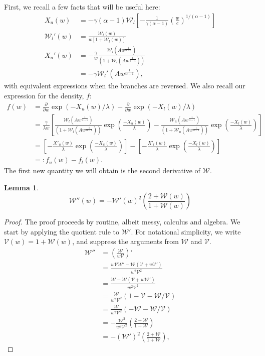 \documentclass{article}
\newcommand{\sW}{\mathscr{W}}
\newcommand{\sV}{\mathscr{V}}
\newtheorem{lemma}{Lemma}
\begin{document}
First, we recall a few facts that will be useful here:
%
\begin{align}
    X_u(w) &= -\gamma (\alpha - 1) \sW_l\left[ - \frac{1}{\gamma (\alpha - 1)} \left( \frac{w}{c} \right)^{1 / (\alpha - 1)} \right]\\
    \sW_l'(w) &= \frac{\sW_l(w)}{w [1 + \sW_l(w)]} \label{eq:W_prime}\\
    X_u'(w) &= - \frac{\gamma}{w} \frac{\sW_l(A w^{ \frac{1}{\alpha-1} })}{ \left( 1 + \sW_l(A w^{ \frac{1}{\alpha-1} }) \right)}\\
    &= - \gamma \sW_l'(A w^{ \frac{1}{\alpha-1} }),
\end{align}
%
with equivalent expressions when the branches are reversed. We also recall our expression for the density, $f$:
%
\begin{align}
    f(w) &= \frac{\partial}{\partial w} \exp(-X_u(w)/ \lambda) - \frac{\partial}{\partial w} \exp(-X_l(w)/\lambda) \\
    &= \frac{\gamma}{\lambda w} \left[ \frac{\sW_l(A w^{ \frac{1}{\alpha-1} })}{ \left( 1 + \sW_l(A w^{ \frac{1}{\alpha-1} }) \right)} \exp\left(\frac{-X_{u}(w)}{\lambda}\right) - \frac{\sW_u(A w^{ \frac{1}{\alpha-1} })}{ \left( 1 + \sW_u(A w^{ \frac{1}{\alpha-1} }) \right)}  \exp\left(\frac{-X_{l}(w)}{\lambda}\right) \right]\\
    &= \left[ - \frac{X'_u(w)}{\lambda} \exp\left(\frac{-X_{u}(w)}{\lambda}\right) \right] - \left[- \frac{X'_l(w)}{\lambda} \exp\left(\frac{-X_{l}(w)}{\lambda}\right) \right] \label{eq:wt_dens}\\
    &=: f_u(w) - f_l(w). \label{eq:f_u_f_l}
\end{align}
%
The first new quantity we will obtain is the second derivative of $\sW$.

\begin{lemma}
    \begin{equation}
        \sW''(w) = - \sW'(w)^2 \left(\frac{2 + \sW(w)}{1 + \sW(w)}\right) \label{eq:W_prime_prime}
    \end{equation}
\end{lemma}
\begin{proof}
    The proof proceeds by routine, albeit messy, calculus and algebra. We start by applying the quotient rule to $\sW'$. For notational simplicity, we write $\sV(w) = 1 + \sW(w)$, and suppress the arguments from $\sW$ and $\sV$.
    \begin{align}
        \sW'' &= \left( \frac{\sW}{w \sV} \right)'\\
        &= \frac{w \sV \sW' - \sW ( \sV + w \sV')}{w^2 \sV^2}\\
        &= \frac{\sW - \sW (\sV + w \sW')}{w^2 \sV^2}\\
        &= \frac{\sW}{w^2 \sV^2} ( 1 - \sV - \sW / \sV) \label{eq:w_prime_prime_1}\\
        &= \frac{\sW}{w^2 \sV^2} (- \sW - \sW / \sV) \label{eq:w_prime_prime_2}\\
        &= -\frac{\sW^2}{w^2 \sV^2} \left( \frac{2 + \sW}{1 + \sW} \right)\\
        &= - (\sW')^2 \left( \frac{2 + \sW}{1 + \sW} \right),
    \end{align}
\end{proof}
\end{document}

